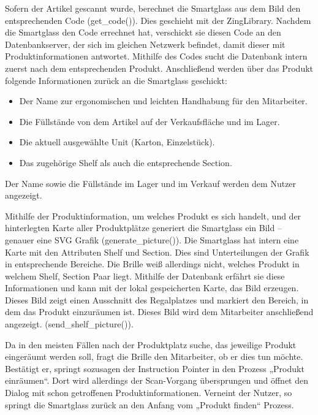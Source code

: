 Sofern der Artikel gescannt wurde, berechnet die Smartglass aus dem Bild den entsprechenden Code (get\_code()). Dies geschieht mit der ZingLibrary. Nachdem die Smartglass den Code errechnet hat, verschickt sie diesen Code an den Datenbankserver, der sich im gleichen Netzwerk befindet, damit dieser mit Produktinformationen antwortet. Mithilfe des Codes sucht die Datenbank intern zuerst nach dem entsprechenden Produkt. Anschließend werden über das Produkt folgende Informationen zurück an die Smartglass geschickt:
\begin{itemize}
	\item Der Name zur ergonomischen und leichten Handhabung für den Mitarbeiter.
	\item Die Füllstände von dem Artikel auf der Verkaufsfläche und im  Lager.
	\item Die aktuell ausgewählte Unit (Karton, Einzelstück).
	\item Das zugehörige Shelf als auch die entsprechende Section.
\end{itemize}
Der Name sowie die Füllstände im Lager und im Verkauf werden dem Nutzer angezeigt.

Mithilfe der Produktinformation, um welches Produkt es sich handelt, und der hinterlegten Karte aller Produktplätze generiert die Smartglass ein Bild – genauer eine SVG Grafik (generate\_picture()). Die Smartglass hat intern eine Karte mit den Attributen Shelf und Section. Dies sind Unterteilungen der Grafik in entsprechende Bereiche. Die Brille weiß allerdings nicht, welches Produkt in welchem Shelf, Section Paar liegt. Mithilfe der Datenbank erfährt sie diese Informationen und kann mit der lokal gespeicherten Karte, das Bild erzeugen. Dieses Bild zeigt einen Ausschnitt des Regalplatzes und markiert den Bereich, in dem das Produkt einzuräumen ist. Dieses Bild wird dem Mitarbeiter anschließend angezeigt. (send\_shelf\_picture()).

Da in den meisten Fällen nach der Produktplatz suche, das jeweilige Produkt eingeräumt werden soll, fragt die Brille den Mitarbeiter, ob er dies tun möchte.
Bestätigt er, springt sozusagen der Instruction Pointer in den Prozess „Produkt einräumen“. Dort wird allerdings der Scan-Vorgang übersprungen und öffnet den Dialog mit schon getroffenen Produktinformationen. 
Verneint der Nutzer, so springt die Smartglass zurück an den Anfang vom „Produkt finden“ Prozess. 

